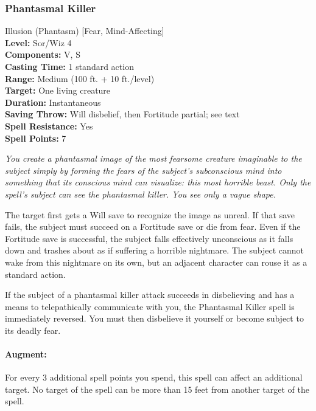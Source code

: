 \subsubsection{Phantasmal Killer}
\label{Spell:PhantasmalKiller}
Illusion (Phantasm) [Fear, Mind-Affecting]
\\ \textbf{Level:} Sor/Wiz 4
\\ \textbf{Components:} V, S
\\ \textbf{Casting Time:} 1 standard action
\\ \textbf{Range:} Medium (100 ft. + 10 ft./level)
\\ \textbf{Target:} One living creature
\\ \textbf{Duration:} Instantaneous
\\ \textbf{Saving Throw:} Will disbelief, then Fortitude partial; see text
\\ \textbf{Spell Resistance:} Yes
\\ \textbf{Spell Points:} 7

\emph{You create a phantasmal image of the most fearsome creature imaginable to the subject simply by 
forming the fears of the subject's subconscious mind into something that its conscious mind can visualize: 
this most horrible beast. Only the spell's subject can see the phantasmal killer. You see only a vague shape.} 

The target first gets a Will save to recognize the image as unreal. 
If that save fails, the subject must succeed on a Fortitude save or die from fear. 
Even if the Fortitude save is successful, the subject falls effectively unconscious as it falls down and trashes about
as if suffering a horrible nightmare. The subject cannot wake from this nightmare on its own, but an adjacent character can
rouse it as a standard action.

If the subject of a phantasmal killer attack succeeds in disbelieving and has a means to telepathically communicate with you, the Phantasmal Killer spell is immediately reversed. You must then disbelieve it yourself or become subject to its deadly fear.

\paragraph{Augment:}
For every 3 additional spell points you spend, this spell can affect an additional target.
No target of the spell can be more than 15 feet from another target of the spell.

